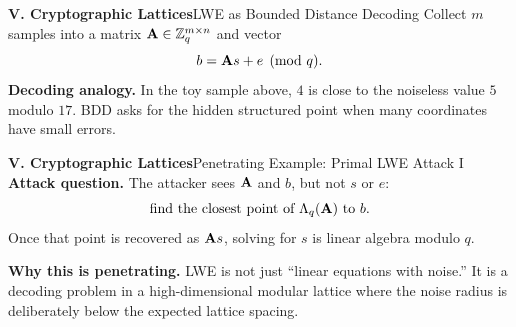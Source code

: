 \begin{frame}[shrink=8]{\textbf{V. Cryptographic Lattices}}{LWE as Bounded Distance Decoding}
Collect $m$ samples into a matrix $\mathbf{A}\in\mathbb{Z}_q^{m\times n}$ and vector
\[
  b=\mathbf{A} s+e\pmod q.
\]
\textbf{Decoding analogy.}\; In the toy sample above, $4$ is close to the noiseless value $5$ modulo $17$.
BDD asks for the hidden structured point when many coordinates have small errors.
\begin{center}
\end{center}
\end{frame}

\begin{frame}{\textbf{V. Cryptographic Lattices}}{Penetrating Example: Primal LWE Attack I}
\small
{}
\textbf{Attack question.}\; The attacker sees $\mathbf{A}$ and $b$, but not $s$ or $e$:
\[
  \text{find the closest point of }\Lambda_q(\mathbf{A})\text{ to }b.
\]
Once that point is recovered as $\mathbf{A} s$, solving for $s$ is linear algebra modulo $q$.

\textbf{Why this is penetrating.}\; LWE is not just ``linear equations with noise.''  It is a decoding problem in a high-dimensional modular lattice where the noise radius is deliberately below the expected lattice spacing.
\end{frame}

